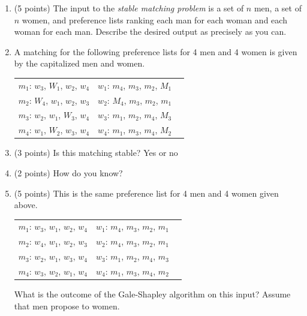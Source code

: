 \documentclass[11pt]{article}
\begin{document}
\begin{enumerate}
\item (5 points) The input to the \emph{stable
matching problem} is a set of $n$ men, a set of $n$ women, and preference lists
ranking each man for each woman and each woman for each man. Describe the
desired output as precisely as you can.

\vspace{1in}

\item A matching for the following preference lists for 4 men and 4 women is given by
the capitalized men and women.

\begin{center}
\begin{tabular}{ c c c }
    $m_1$: $w_3$, $W_1$, $w_2$, $w_4$ &  $w_1$: $m_4$, $m_3$, $m_2$, $M_1$\\
    $m_2$: $W_4$, $w_1$, $w_2$, $w_3$ &  $w_2$: $M_4$, $m_3$, $m_2$, $m_1$\\
    $m_3$: $w_2$, $w_1$, $W_3$, $w_4$ &  $w_3$: $m_1$, $m_2$, $m_4$, $M_3$\\ 
    $m_4$: $w_1$, $W_2$, $w_3$, $w_4$ &  $w_4$: $m_1$, $m_3$, $m_4$, $M_2$
\end{tabular}
\end{center}

    
    \item (3 points) Is this matching stable? Yes or no

    \item (2 points) How do you know?

\vspace{1in}


\item (5 points)
This is the same preference list for 4 men and 4 women given above.

\begin{center}
\begin{tabular}{ c c c }
    $m_1$: $w_3$, $w_1$, $w_2$, $w_4$ &  $w_1$: $m_4$, $m_3$, $m_2$, $m_1$\\
    $m_2$: $w_4$, $w_1$, $w_2$, $w_3$ &  $w_2$: $m_4$, $m_3$, $m_2$, $m_1$\\
    $m_3$: $w_2$, $w_1$, $w_3$, $w_4$ &  $w_3$: $m_1$, $m_2$, $m_4$, $m_3$\\ 
    $m_4$: $w_3$, $w_2$, $w_1$, $w_4$ &  $w_4$: $m_1$, $m_3$, $m_4$, $m_2$
\end{tabular}
\end{center}

 What is the outcome of the Gale-Shapley algorithm on this input? Assume that men propose to women.
\vspace{1in}


\end{enumerate}
\end{document}
